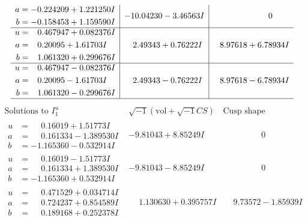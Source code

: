 \documentclass[1p]{elsarticle_modified}
\theoremstyle{definition}
\newcommand{\I}{\sqrt{-1}}
\begin{document}
$$\begin{array}{c|c|c}
\begin{aligned}
a &= -0.224209 + 1.221250 I \\
b &= -0.158453 + 1.159590 I\end{aligned}
 & -10.04230 - 3.46563 I & \phantom{-0.000000 } 0 \\ \hline\begin{aligned}
u &= \phantom{-}0.467947 + 0.082376 I \\
a &= \phantom{-}0.20095 + 1.61703 I \\
b &= \phantom{-}1.061320 + 0.299676 I\end{aligned}
 & \phantom{-}2.49343 + 0.76222 I & \phantom{-}8.97618 + 6.78934 I \\ \hline\begin{aligned}
u &= \phantom{-}0.467947 - 0.082376 I \\
a &= \phantom{-}0.20095 - 1.61703 I \\
b &= \phantom{-}1.061320 - 0.299676 I\end{aligned}
 & \phantom{-}2.49343 - 0.76222 I & \phantom{-}8.97618 - 6.78934 I\\
 \hline 
 \end{array}$$\newpage$$\begin{array}{c|c|c}  
\text{Solutions to }I^u_{1}& \I (\text{vol} + \sqrt{-1}CS) & \text{Cusp shape}\\
 \hline 
\begin{aligned}
u &= \phantom{-}0.16019 + 1.51773 I \\
a &= \phantom{-}0.161334 - 1.389530 I \\
b &= -1.165360 - 0.532914 I\end{aligned}
 & -9.81043 + 8.85249 I & \phantom{-0.000000 } 0 \\ \hline\begin{aligned}
u &= \phantom{-}0.16019 - 1.51773 I \\
a &= \phantom{-}0.161334 + 1.389530 I \\
b &= -1.165360 + 0.532914 I\end{aligned}
 & -9.81043 - 8.85249 I & \phantom{-0.000000 } 0 \\ \hline\begin{aligned}
u &= \phantom{-}0.471529 + 0.034714 I \\
a &= \phantom{-}0.724237 + 0.854589 I \\
b &= \phantom{-}0.189168 + 0.252378 I\end{aligned}
 & \phantom{-}1.130630 + 0.395757 I & \phantom{-}9.73572 - 1.85939 I \\ \hline\begin{aligned}

\end{aligned}
\end{array}$$
\end{document}
